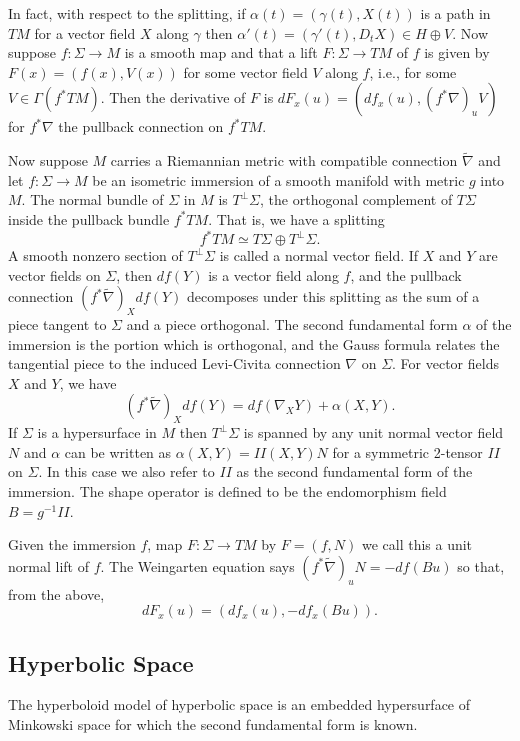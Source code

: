 \documentclass{amsart}
\newcommand{\two}{I\!\!I}
\begin{document}
In fact, with respect to the splitting, if $\alpha(t) = (\gamma(t),X(t))$ is a path in $TM$ for a vector field $X$ along $\gamma$ then $\alpha'(t) = (\gamma'(t),D_tX) \in H \oplus V$.
Now suppose $f:\Sigma \to M$ is a smooth map and that a lift $F: \Sigma \to TM$ of $f$ is given by $F(x) = (f(x),V(x))$ for some vector field $V$ along $f$, i.e., for some $V \in \Gamma(f^*TM)$.
Then the derivative of $F$ is $dF_x(u) = (df_x(u), (f^*\nabla)_u V)$ for $f^*\nabla$ the pullback connection on $f^*TM$.


Now suppose $M$ carries a Riemannian metric with compatible connection $\tilde{\nabla}$ and let $f: \Sigma \to M$ be an isometric immersion of a smooth manifold with metric $g$ into $M$.
The normal bundle of $\Sigma$ in $M$ is $T^\perp\Sigma$, the orthogonal complement of $T\Sigma$ inside the pullback bundle $f^*TM$.
That is, we have a splitting
\[
f^*TM \simeq T\Sigma \oplus T^\perp\Sigma.
\]
A smooth nonzero section of $T^\perp\Sigma$ is called a normal vector field.
If $X$ and $Y$ are vector fields on $\Sigma$, then $df(Y)$ is a vector field along $f$, and the pullback connection $(f^*\tilde{\nabla})_Xdf(Y)$ decomposes under this splitting as the sum of a piece tangent to $\Sigma$ and a piece orthogonal. 
The second fundamental form $\alpha$ of the immersion is the portion which is orthogonal, and the Gauss formula relates the tangential piece to the induced Levi-Civita connection $\nabla$ on $\Sigma$.
For vector fields $X$ and $Y$, we have
\[
(f^*\tilde{\nabla})_Xdf(Y) = df(\nabla_XY) + \alpha(X,Y).
\]
If $\Sigma$ is a hypersurface in $M$ then $T^\perp\Sigma$ is spanned by any unit normal vector field $N$ and $\alpha$ can be written as $\alpha(X,Y) = \two(X,Y)N$ for a symmetric 2-tensor $\two$ on $\Sigma$.
In this case we also refer to $\two$ as the second fundamental form of the immersion. 
The shape operator is defined to be the endomorphism field $B = g^{-1}\two$.

Given the immersion $f$, map $F: \Sigma \to TM$ by $F = (f,N)$ we call this a unit normal lift of $f$.
The Weingarten equation says $(f^*\tilde{\nabla})_uN = -df(Bu)$ so that, from the above, 
\[
dF_x(u) = (df_x(u),-df_x(Bu)).
\]

\subsection{Hyperbolic Space}

The hyperboloid model of hyperbolic space is an embedded hypersurface of Minkowski space for which the second fundamental form is known. 
\end{document}
